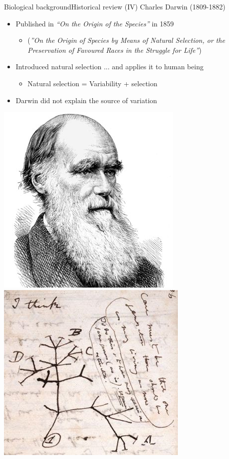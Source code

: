 \documentclass[10pt,compress]{beamer} %
\begin{document}
\begin{frame}{Biological background}{Historical review (IV)}
	Charles Darwin (1809-1882)
	\begin{itemize}
		\item Published in \textit{``On the Origin of the Species''} in 1859
			\begin{itemize}
			\item[] \small{(\textit{''On the Origin of Species by Means of Natural Selection, or the Preservation of Favoured Races in the Struggle for Life''})}
			\end{itemize}
		\item Introduced \alert{natural selection} ... and applies it to human being
			\begin{itemize}
			\item Natural selection = Variability + selection
			\end{itemize}
		\item Darwin did not explain the source of variation
	\end{itemize}
	\begin{center}
	\includegraphics[width=0.2\linewidth]{figs/darwin.jpg}\hspace{1cm}
	\includegraphics[width=0.2\linewidth]{figs/ithink.jpg}
	\end{center}
\end{frame}
\end{document}
